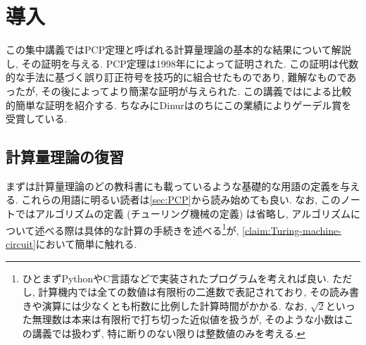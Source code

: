 \chapter{導入}

この集中講義ではPCP定理と呼ばれる計算量理論の基本的な結果について解説し, その証明を与える.
PCP定理は1998年に\citet{AroraS98,AroraLMSS98}によって証明された.
この証明は代数的な手法に基づく誤り訂正符号を技巧的に組合せたものであり, 難解なものであったが, その後\citet{Din07}によってより簡潔な証明が与えられた.
この講義では\citet{Din07}による比較的簡単な証明を紹介する.
ちなみにDinurはのちにこの業績によりゲーデル賞を受賞している.

\section{計算量理論の復習}
まずは計算量理論のどの教科書にも載っているような基礎的な用語の定義を与える. これらの用語に明るい読者は\cref{sec:PCP}から読み始めても良い.
なお, このノートではアルゴリズムの定義 (チューリング機械の定義) は省略し, アルゴリズムについて述べる際は具体的な計算の手続きを述べる\footnote{ひとまずPythonやC言語などで実装されたプログラムを考えれば良い. ただし, 計算機内では全ての数値は有限桁の二進数で表記されており, その読み書きや演算には少なくとも桁数に比例した計算時間がかかる. なお, $\sqrt{2}$といった無理数は本来は有限桁で打ち切った近似値を扱うが, そのような小数はこの講義では扱わず, 特に断りのない限りは整数値のみを考える.}が, \cref{claim:Turing-machine-circuit}において簡単に触れる.

